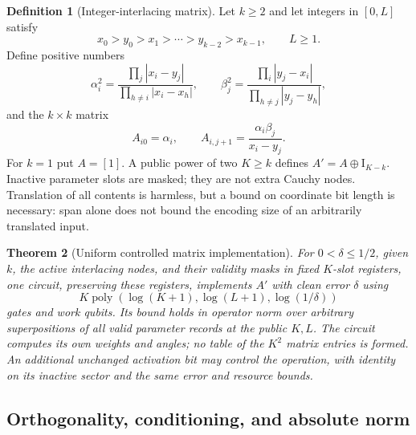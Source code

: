 \documentclass[11pt]{article}
\newtheorem{theorem}{Theorem}
\theoremstyle{definition}
\newtheorem{definition}[theorem]{Definition}
\newcommand{\poly}{\operatorname{poly}}
\newcommand{\Id}{\mathrm I}
\begin{document}
\begin{definition}[Integer-interlacing matrix]\label{def:matrix}
Let $k\ge2$ and let integers in $[0,L]$ satisfy
\[
 x_0>y_0>x_1>\cdots>y_{k-2}>x_{k-1},\qquad L\ge1.
\]
Define positive numbers
\[
 \alpha_i^2=\frac{\prod_j|x_i-y_j|}{\prod_{h\ne i}|x_i-x_h|},
 \qquad
 \beta_j^2=\frac{\prod_i|y_j-x_i|}{\prod_{h\ne j}|y_j-y_h|},
\]
and the $k\times k$ matrix
\begin{equation}\label{eq:A}
 A_{i0}=\alpha_i,\qquad
 A_{i,j+1}=\frac{\alpha_i\beta_j}{x_i-y_j}.
\end{equation}
For $k=1$ put $A=[1]$. A public power of two $K\ge k$ defines
$A'=A\oplus\Id_{K-k}$. Inactive parameter slots are masked; they are not
extra Cauchy nodes. Translation of all contents is harmless, but a bound
on coordinate bit length is necessary: span alone does not bound the
encoding size of an arbitrarily translated input.
\end{definition}

\begin{theorem}[Uniform controlled matrix implementation]\label{thm:core}
For $0<\delta\le1/2$, given $k$, the active interlacing nodes, and their validity masks in fixed
$K$-slot registers, one circuit, preserving these registers, implements
$A'$ with clean error $\delta$ using
\[
 K\poly(\log(K+1),\log(L+1),\log(1/\delta))
\]
gates and work qubits. Its bound holds in operator norm over arbitrary
superpositions of all valid parameter records at the public $K,L$.
The circuit computes its own weights and angles; no table of the $K^2$
matrix entries is formed.
An additional unchanged activation bit may control the operation, with
identity on its inactive sector and the same error and resource bounds.
\end{theorem}

\subsection{Orthogonality, conditioning, and absolute norm}
\end{document}
